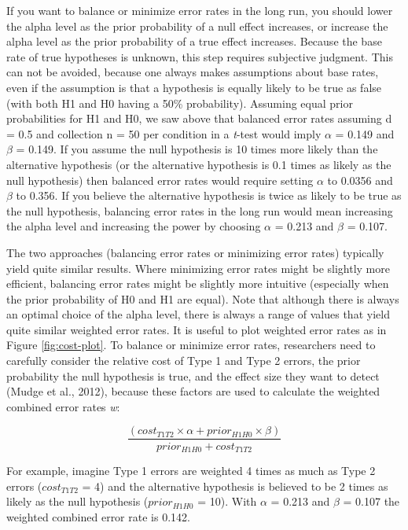 \documentclass[
  english,
  ,jou,floatsintext]{apa6}
\begin{document}
If you want to balance or minimize error rates in the long run, you should lower the alpha level as the prior probability of a null effect increases, or increase the alpha level as the prior probability of a true effect increases. Because the base rate of true hypotheses is unknown, this step requires subjective judgment. This can not be avoided, because one always makes assumptions about base rates, even if the assumption is that a hypothesis is equally likely to be true as false (with both H1 and H0 having a 50\% probability). Assuming equal prior probabilities for H1 and H0, we saw above that balanced error rates assuming d = 0.5 and collection n = 50 per condition in a \emph{t}-test would imply \(\alpha\) = 0.149 and \(\beta\) = 0.149. If you assume the null hypothesis is 10 times more likely than the alternative hypothesis (or the alternative hypothesis is 0.1 times as likely as the null hypothesis) then balanced error rates would require setting \(\alpha\) to 0.0356 and \(\beta\) to 0.356. If you believe the alternative hypothesis is twice as likely to be true as the null hypothesis, balancing error rates in the long run would mean increasing the alpha level and increasing the power by choosing \(\alpha\) = 0.213 and \(\beta\) = 0.107.

The two approaches (balancing error rates or minimizing error rates) typically yield quite similar results. Where minimizing error rates might be slightly more efficient, balancing error rates might be slightly more intuitive (especially when the prior probability of H0 and H1 are equal). Note that although there is always an optimal choice of the alpha level, there is always a range of values that yield quite similar weighted error rates. It is useful to plot weighted error rates as in Figure \ref{fig:cost-plot}. To balance or minimize error rates, researchers need to carefully consider the relative cost of Type 1 and Type 2 errors, the prior probability the null hypothesis is true, and the effect size they want to detect (Mudge et al., 2012), because these factors are used to calculate the weighted combined error rates \emph{w}:

\begin{equation}
\frac{(cost_{T1T2} \times \alpha + prior_{H1H0} \times \beta)}{prior_{H1H0}+cost_{T1T2}}
\label{eq:minimize}
\end{equation}

For example, imagine Type 1 errors are weighted 4 times as much as Type 2 errors (\(cost_{T1T2}\) = 4) and the alternative hypothesis is believed to be 2 times as likely as the null hypothesis (\(prior_{H1H0}\) = 10). With \(\alpha\) = 0.213 and \(\beta\) = 0.107 the weighted combined error rate is 0.142.
\end{document}
